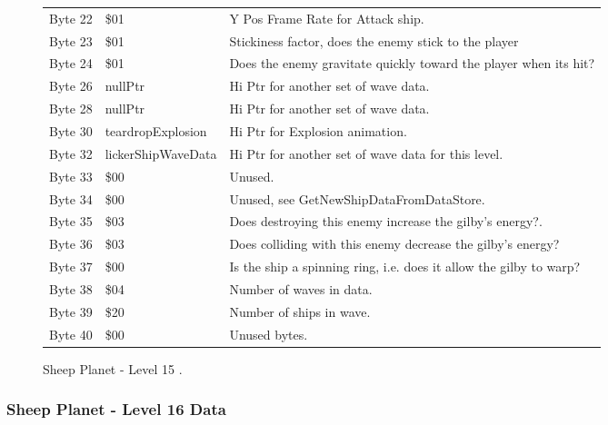 \begin{figure}[H]
{\begin{adjustbox}{width=12cm}
\begin{tabular}{lll}
 Byte 22 & \$01                & Y Pos Frame Rate for Attack ship.                                  \\
 Byte 23 & \$01                & Stickiness factor, does the enemy stick to the player              \\
 Byte 24 & \$01                & Does the enemy gravitate quickly toward the player when its hit?   \\
 Byte 26 & nullPtr            & Hi Ptr for another set of wave data.                               \\
 Byte 28 & nullPtr            & Hi Ptr for another set of wave data.                               \\
 Byte 30 & teardropExplosion  & Hi Ptr for Explosion animation.                                    \\
 Byte 32 & lickerShipWaveData & Hi Ptr for another set of wave data for this level.                \\
 Byte 33 & \$00                & Unused.                                                            \\
 Byte 34 & \$00                & Unused, see GetNewShipDataFromDataStore.                           \\
 Byte 35 & \$03                & Does destroying this enemy increase the gilby's energy?.           \\
 Byte 36 & \$03                & Does colliding with this enemy decrease the gilby's energy?        \\
 Byte 37 & \$00                & Is the ship a spinning ring, i.e. does it allow the gilby to warp? \\
 Byte 38 & \$04                & Number of waves in data.                                           \\
 Byte 39 & \$20                & Number of ships in wave.                                           \\
 Byte 40 & \$00                & Unused bytes.                                                      \\
\bottomrule
\end{tabular}

  \end{adjustbox}

  }\caption*{Sheep Planet - Level 15
.}
\end{figure}

\clearpage
\subsubsection{Sheep Planet - Level 16 Data}

